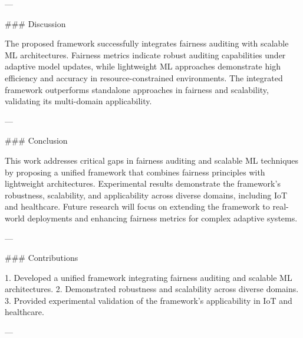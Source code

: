 ---

### Discussion

The proposed framework successfully integrates fairness auditing with scalable ML architectures. Fairness metrics indicate robust auditing capabilities under adaptive model updates, while lightweight ML approaches demonstrate high efficiency and accuracy in resource-constrained environments. The integrated framework outperforms standalone approaches in fairness and scalability, validating its multi-domain applicability.

---

### Conclusion

This work addresses critical gaps in fairness auditing and scalable ML techniques by proposing a unified framework that combines fairness principles with lightweight architectures. Experimental results demonstrate the framework's robustness, scalability, and applicability across diverse domains, including IoT and healthcare. Future research will focus on extending the framework to real-world deployments and enhancing fairness metrics for complex adaptive systems.

---

### Contributions

1. Developed a unified framework integrating fairness auditing and scalable ML architectures.
2. Demonstrated robustness and scalability across diverse domains.
3. Provided experimental validation of the framework's applicability in IoT and healthcare.

---